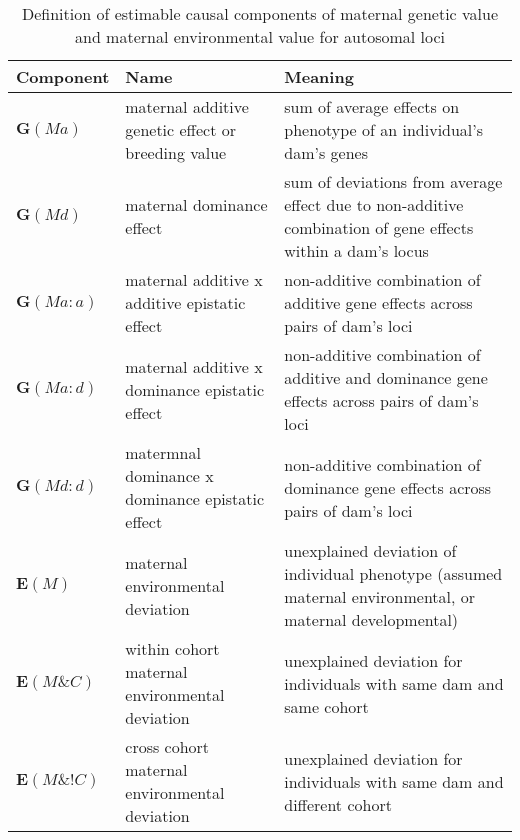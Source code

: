 \begin{table}
\centering
\caption{Definition of estimable causal components of maternal genetic value and maternal environmental value for autosomal loci}
\label{tab.mat}
\vspace{0.1in}
\begin{tabular}{l|p{1.2in}|p{2.4in}}
Component & Name & Meaning \\ \hline
${\bm G(Ma)}$     & maternal additive genetic effect or breeding value &  sum of average effects on phenotype of an individual's dam's genes \\
${\bm G(Md)}$     & maternal dominance effect  & sum of deviations from average effect due to non-additive combination of gene effects within a dam's locus \\
${\bm G(Ma:a)}$   & maternal additive x additive epistatic effect & non-additive combination of additive gene effects across pairs of dam's loci \\
${\bm G(Ma:d)}$   & maternal additive x dominance epistatic effect & non-additive combination of additive and dominance gene effects across pairs of dam's loci \\
${\bm G(Md:d)}$   & matermnal dominance x dominance epistatic effect & non-additive combination of dominance gene effects across pairs of dam's loci\\ \hline
${\bm E(M)}$      & maternal environmental deviation & unexplained deviation of individual phenotype (assumed maternal environmental, or maternal developmental) \\
${\bm E(M\&C)}$    & within cohort maternal environmental deviation & unexplained deviation for individuals with same dam and same cohort \\
${\bm E(M\&!C)}$   & cross cohort maternal environmental deviation & unexplained deviation for individuals with same dam and different cohort \\   \hline
\end{tabular}
\end{table}
